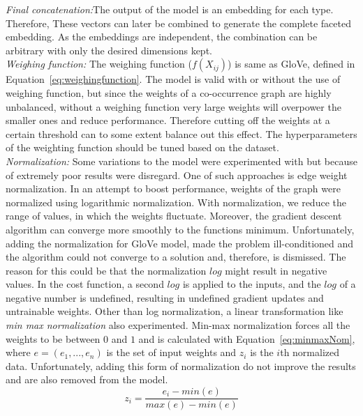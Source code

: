 \emph{Final concatenation:}The output of the model is an embedding for each type. Therefore, These vectors can later be combined to generate the complete faceted embedding. As the embeddings are independent, the combination can be arbitrary with only the desired dimensions kept. \\

\emph{Weighing function:} The weighing function ($f(X_{ij})$) is same as GloVe, defined in Equation~\ref{eq:weighingfunction}. The model is valid with or without the use of weighing function, but since the weights of a co-occurrence graph are highly unbalanced, without a weighing function very large weights will overpower the smaller ones and reduce performance. Therefore cutting off the weights at a certain threshold can to some extent balance out this effect. The hyperparameters of the weighting function should be tuned based on the dataset.\\

\emph{Normalization:} Some variations to the model were experimented with but because of extremely poor results were disregard. One of such approaches is edge weight normalization. In an attempt to boost performance, weights of the graph were normalized using logarithmic normalization. With normalization, we reduce the range of values, in which the weights fluctuate. Moreover, the gradient descent algorithm can converge more smoothly to the functions minimum. Unfortunately, adding the normalization for GloVe model, made the problem ill-conditioned and the algorithm could not converge to a solution and, therefore, is dismissed. The reason for this could be that the normalization $log$ might result in negative values. In the cost function, a second $log$ is applied to the inputs, and the $log$ of a negative number is undefined, resulting in undefined gradient updates and untrainable weights. Other than log normalization, a linear transformation like \emph{min max normalization} also experimented. Min-max normalization forces all the weights to be between $0$ and $1$ and is calculated with Equation~\ref{eq:minmaxNom}, where $e=(e_1,...,e_n)$ is the set of input weights and $z_i$ is the $i$th normalized data. Unfortunately, adding this form of normalization do not improve the results and are also removed from the model.
\begin{equation}
z_{ i }=\frac { e_{ i }-min(e) }{ max(e)-min(e) } 
\label{eq:minmaxNom}
\end{equation}

